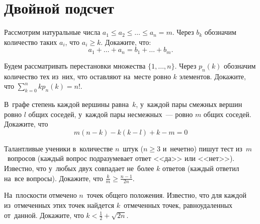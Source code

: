 
\section*{Двойной подсчет}


\begin{problems}

\item
Рассмотрим натуральные числа
$a_1 \leq a_2 \leq \ldots \leq a_n = m$.
Через $b_k$ обозначим количество таких $a_i$, что $a_i \geq k$.
Докажите, что:
\[
    a_1 + \ldots + a_n = b_1 + \ldots + b_m
.\]

\item
Будем рассматривать перестановки множества $\{ 1, \ldots, n\}$.
Через $p_n(k)$ обозначим количество тех из~них, что оставляют на~месте ровно
$k$ элементов.
Докажите, что
\(
    \sum\limits_{k = 0}^n kp_n(k) = n!
\).

\item
В~графе степень каждой вершины равна~$k$, у~каждой пары смежных вершин
ровно $l$ общих соседей, у~каждой пары несмежных~--- ровно $m$ общих соседей.
Докажите, что
\[
    m (n - k) - k (k - l) + k - m = 0
\]

\item
Талантливые ученики в~количестве $n$~штук ($n \geq 3$ и~нечетно)
пишут тест из~$m$~вопросов
(каждый вопрос подразумевает ответ <<да>> или <<нет>>).
Известно, что у~любых двух совпадает не~более $k$ ответов
(каждый ответил на~все вопросы).
Докажите, что $\frac{k}{m} \geqslant \frac{n - 1}{2n}$.

\item
На~плоскости отмечено $n$~точек общего положения.
Известно, что для каждой из~отмеченных этих точек найдется $k$~отмеченных
точек, равноудаленных от~данной.
Докажите, что $k < \frac{1}{2} + \sqrt{2n}$.





\end{problems}

